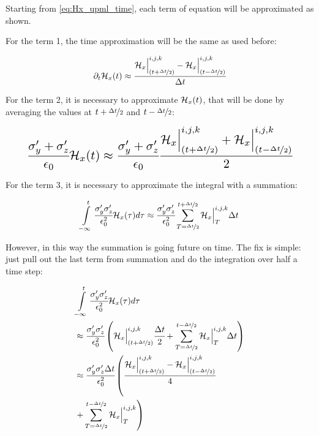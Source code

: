 Starting from \eqref{eq:Hx_upml_time}, each term of equation will be approximated as shown.

For the term 1, the time approximation will be the same as used before:

\begin{align}
    \partial_t\mathcal{H}_x(t) \approx \cfrac{\mathcal{H}_x\Big|_{(t+\nicefrac{\Delta t}{2})}^{i,j,k}-\mathcal{H}_x\Big|^{i,j,k}_{(t-\nicefrac{\Delta t}{2})}}{\Delta t}
\end{align}

For the term 2, it is necessary to approximate $\mathcal{H}_x(t)$, that will be done by averaging the values at $t + \nicefrac{\Delta t}{2}$ and $t - \nicefrac{\Delta t}{2}$:

\begin{align}
    \resizebox{.9\hsize}{!}{$
    \cfrac{\sigma_y\Prime + \sigma_z\Prime}{\epsilon_0}\Hht_x(t)\approx
    \cfrac{\sigma_y\Prime + \sigma_z\Prime}{\epsilon_0}\cfrac{\Hht_x\Big|_{(t+\nicefrac{\dt}{2})}^{i,j,k}+\Hht_x\Big|^{i,j,k}_{(t-\nicefrac{\dt}{2})}}{2}
    $}
\end{align}

For the term 3, it is necessary to approximate the integral with a summation:

\begin{align}
    \int\limits_{-\infty}^t\cfrac{\sigma_y^{\prime}\sigma_z^{\prime}}{\epsilon_0^2}\mathcal{H}_x(\tau)d\tau \approx \cfrac{\sigma_y^{\prime}\sigma_z^{\prime}}{\epsilon_0^2} \sum_{T=\nicefrac{\Delta t}{2}}^{t + \nicefrac{\Delta t}{2}}\mathcal{H}_x\Big|^{i,j,k}_{T}\Delta t
\end{align}

However, in this way the summation is going future on time. The fix is simple: just pull out the last term from summation and do the integration over half a time step:

\begin{align}
    &\int\limits_{-\infty}^t\cfrac{\sigma_y^{\prime}\sigma_z^{\prime}}{\epsilon_0^2}\mathcal{H}_x(\tau)d\tau \nonumber \\ \nonumber
    &\approx \cfrac{\sigma_y^{\prime}\sigma_z^{\prime}}{\epsilon_0^2} \left( \mathcal{H}_x\Big|_{(t+\nicefrac{\Delta t}{2})}^{i,j,k} \cfrac{\Delta t}{2} + \sum\limits_{T=\nicefrac{\Delta t}{2}}^{t - \nicefrac{\Delta t}{2}}\mathcal{H}_x\Big|^{i,j,k}_{T}\Delta t \right) \\ \nonumber
    &\approx\cfrac{\sigma_y^{\prime}\sigma_z^{\prime}\Delta t}{\epsilon_0^2} \left( \cfrac{\mathcal{H}_x\Big|_{(t+\nicefrac{\Delta t}{2})}^{i,j,k}-\mathcal{H}_x\Big|^{i,j,k}_{(t-\nicefrac{\Delta t}{2})}}{4} \right. \\ & \left. + \sum\limits_{T=\nicefrac{\Delta t}{2}}^{t - \nicefrac{\Delta t}{2}}\mathcal{H}_x\Big|^{i,j,k}_{T} \right)
\end{align}


